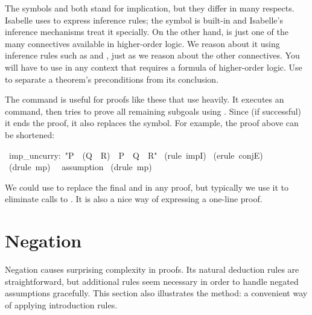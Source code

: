 The symbols \isa{\isasymLongrightarrow} and \isa{\isasymlongrightarrow}
both stand for implication, but they differ in many respects.  Isabelle
uses \isa{\isasymLongrightarrow} to express inference rules; the symbol is
built-in and Isabelle's inference mechanisms treat it specially.  On the
other hand, \isa{\isasymlongrightarrow} is just one of the many connectives
available in higher-order logic.  We reason about it using inference rules
such as  and , just as we reason about the other
connectives.  You will have to use \isa{\isasymlongrightarrow} in any
context that requires a formula of higher-order logic.  Use
\isa{\isasymLongrightarrow} to separate a theorem's preconditions from its
conclusion.%

\medskip
{}%
The  command is useful for proofs like these that use
 heavily.  It executes an
 command, then tries to prove all remaining subgoals using
.  Since (if successful) it ends the proof, it also replaces the 
 symbol.  For example, the proof above can be shortened:
\begin{isabelle}
\ imp_uncurry:\
"P\ \isasymlongrightarrow\ (Q\
\isasymlongrightarrow\ R)\ \isasymLongrightarrow\ P\
\isasymand\ Q\ \isasymlongrightarrow\
R"\isanewline
{}\ (rule\ impI)\isanewline
\isacommand{apply}\ (erule\ conjE)\isanewline
{}\ (drule\ mp)\isanewline
\ \ assumption\isanewline
\isacommand{by}\ (drule\ mp)
\end{isabelle}
We could use \isacommand{by} to replace the final \isacommand{apply} and
\isacommand{done} in any proof, but typically we use it
to eliminate calls to .  It is also a nice way of expressing a
one-line proof.%
\index{by@\isacommand{by} (command)|)}



\section{Negation}
 
%
Negation causes surprising complexity in proofs.  Its natural 
deduction rules are straightforward, but additional rules seem 
necessary in order to handle negated assumptions gracefully.  This section
also illustrates the  method: a convenient way of
applying introduction rules.

